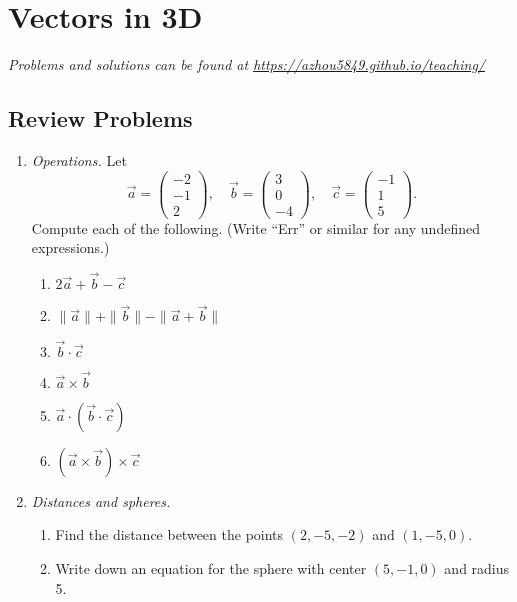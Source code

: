 \section{Vectors in 3D}

\emph{Problems and solutions can be found at \url{https://azhou5849.github.io/teaching/}}

\subsection{Review Problems}

\begin{enumerate}
\item \emph{Operations.} Let
\begin{equation*}
\vec{a} = \begin{pmatrix} -2 \\ -1 \\ 2 \end{pmatrix},\quad\vec{b} = \begin{pmatrix} 3 \\ 0 \\ -4 \end{pmatrix},\quad\vec{c} = \begin{pmatrix} -1 \\ 1 \\ 5 \end{pmatrix}.
\end{equation*}
Compute each of the following. (Write ``Err'' or similar for any undefined expressions.)
\begin{multicols}{2}
\begin{enumerate}
\item $2\vec{a} + \vec{b} - \vec{c}$
\item $\|\vec{a}\| + \|\vec{b}\| - \|\vec{a} + \vec{b}\|$
\item $\vec{b}\cdot\vec{c}$
\item $\vec{a}\times\vec{b}$
\item $\vec{a}\cdot (\vec{b}\cdot\vec{c})$
\item $(\vec{a}\times\vec{b})\times\vec{c}$
\end{enumerate}
\end{multicols}
\item \emph{Distances and spheres.} 
\begin{enumerate}
\item Find the distance between the points $(2, -5, -2)$ and $(1, -5, 0)$.
\item Write down an equation for the sphere with center $(5, -1, 0)$ and radius 5.

\end{enumerate}
\end{enumerate}
